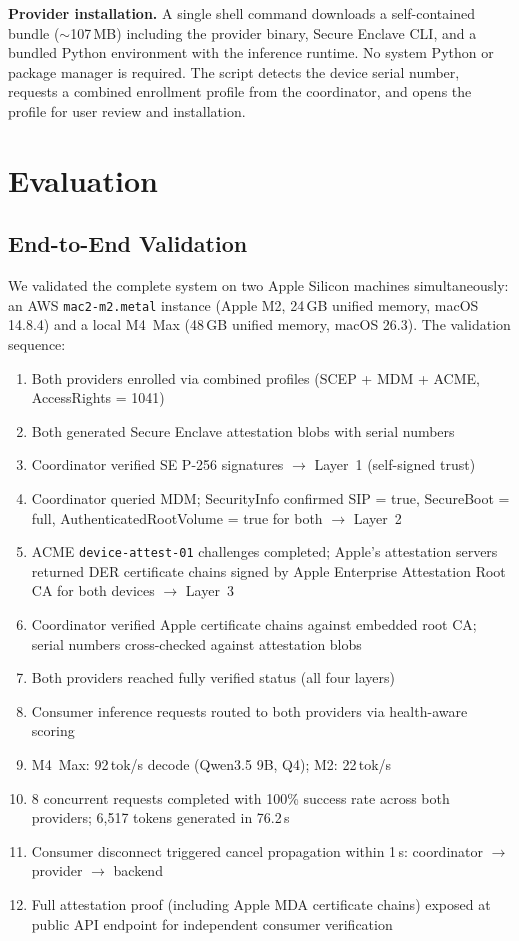 \documentclass[10pt,twocolumn,letterpaper]{article}
\begin{document}
\textbf{Provider installation.} A single shell command downloads a self-contained bundle ($\sim$107\,MB) including the provider binary, Secure Enclave CLI, and a bundled Python environment with the inference runtime. No system Python or package manager is required. The script detects the device serial number, requests a combined enrollment profile from the coordinator, and opens the profile for user review and installation.

\section{Evaluation}
\label{sec:eval}

\subsection{End-to-End Validation}

We validated the complete system on two Apple Silicon machines simultaneously: an AWS \texttt{mac2-m2.metal} instance (Apple M2, 24\,GB unified memory, macOS 14.8.4) and a local M4~Max (48\,GB unified memory, macOS 26.3). The validation sequence:

\begin{enumerate}[leftmargin=*,itemsep=1pt]
    \item Both providers enrolled via combined profiles (SCEP + MDM + ACME, AccessRights = 1041)
    \item Both generated Secure Enclave attestation blobs with serial numbers
    \item Coordinator verified SE P-256 signatures $\to$ Layer~1 (self-signed trust)
    \item Coordinator queried MDM; SecurityInfo confirmed SIP = true, SecureBoot = full, AuthenticatedRootVolume = true for both $\to$ Layer~2
    \item ACME \texttt{device-attest-01} challenges completed; Apple's attestation servers returned DER certificate chains signed by Apple Enterprise Attestation Root CA for both devices $\to$ Layer~3
    \item Coordinator verified Apple certificate chains against embedded root CA; serial numbers cross-checked against attestation blobs
    \item Both providers reached fully verified status (all four layers)
    \item Consumer inference requests routed to both providers via health-aware scoring
    \item M4~Max: 92\,tok/s decode (Qwen3.5 9B, Q4); M2: 22\,tok/s
    \item 8 concurrent requests completed with 100\% success rate across both providers; 6,517 tokens generated in 76.2\,s
    \item Consumer disconnect triggered cancel propagation within 1\,s: coordinator $\to$ provider $\to$ backend
    \item Full attestation proof (including Apple MDA certificate chains) exposed at public API endpoint for independent consumer verification
\end{enumerate}
\end{document}

